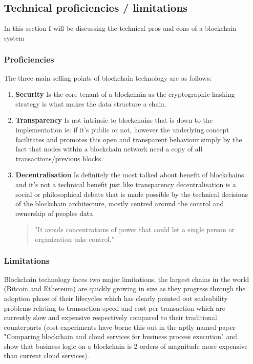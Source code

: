 \documentclass[12pt]{report}
\begin{document}

\subsection{Technical proficiencies / limitations}

In this section I will be discussing the technical pros and cons of a blockchain system

\subsubsection{Proficiencies}

The three main selling points of blockchain technology are as follows:

\begin{enumerate}
	\item \textbf{Security} Is the core tenant of a blockchain as the cryptographic hashing strategy is what makes the data structure a chain.
	\item \textbf{Transparency} Is not intrinsic to blockchains that is down to the implementation ie: if it's public or not, however the underlying concept facilitates and promotes this open and transparent behaviour simply by the fact that nodes within a blockchain network need a copy of all transactions/previous blocks.
	\item \textbf{Decentralisation} Is definitely the most talked about benefit of blockchains and it's not a technical benefit just like transparency decentralisation is a social or philosophical debate that is made possible by the technical decisions of the blockchain architecture, mostly centred around the control and ownership of peoples data \begin{quote}"It avoids concentrations of power that could let a single person or organization take control."\cite{bohme2015bitcoin}\end{quote} 
\end{enumerate}


\subsubsection{Limitations}

Blockchain technology faces two major limitations, the largest chains in the world (Bitcoin and Ethereum) are quickly growing in size as they progress through the adoption phase of their lifecycles which has clearly pointed out scaleability problems relating to transaction speed and cost per transaction which are currently slow and expensive respectively compared to their traditional counterparts (cost experiments have borne this out in the aptly named paper "Comparing blockchain and cloud services for business process execution"\cite{rimba2017comparing} and show that business logic on a blockchain is 2 orders of magnitude more expensive than current cloud services).
\end{document}

